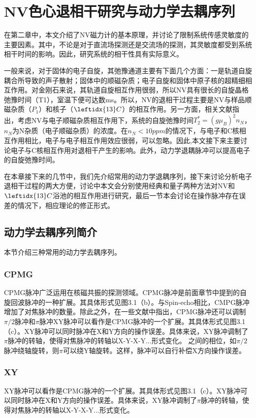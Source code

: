 
\chapter{NV色心退相干研究与动力学去耦序列}
在第二章中，本文介绍了NV磁力计的基本原理，并讨论了限制系统传感灵敏度的主要因素。其中，不论是对于直流场探测还是交流场的探测，其灵敏度都受到系统相干时间的影响。因此，研究系统的相干性具有实际意义。

一般来说，对于固体的电子自旋，其弛豫通道主要有下面几个方面：一是轨道自旋耦合所导致的声子散射；固体中的顺磁杂质；电子自旋和固体中原子核的超精细相互作用。对金刚石来说，其轨道自旋相互作用很弱，所以NV具有很长的自旋晶格弛豫时间（T1），室温下便可达数\si{ms}。所以，NV的退相干过程主要是NV与样品顺磁杂质（$P_1$）和核子（$\leftidx{13}C$）的相互作用。另一方面，相关文献指出，考虑NV与电子顺磁杂质相互作用下，系统的自旋弛豫时间$T_2^*=(g \mu_B)^2 n_N$，$n_N$为N杂质（电子顺磁杂质）的浓度。在$n_N < 10 \si{ppm}$的情况下，与电子和C核相互作用相比，电子与电子相互作用效应很弱，可以忽略。因此,本文接下来主要讨论电子与C核相互作用对退相干产生的影响。此外，动力学退耦脉冲可以提高电子的自旋弛豫时间。

在本章接下来的几节中，我们先介绍常用的动力学退耦序列，接下来讨论分析电子退相干过程的两大方便，讨论中本文会分别使用经典和量子两种方法对NV和$\leftidx{13}C$浴池的相互作用进行研究，最后一节本会讨论在操作脉冲存在误差的情况下，相应理论的修正形式。
\section{动力学去耦序列简介}
本节介绍三种常用的动力学去耦序列。
\subsection{CPMG}
CPMG脉冲广泛运用在核磁共振的探测领域。CPMG脉冲是前面章节中提到的自旋回波脉冲的一种扩展。其具体形式见图3.1（b）。与Spin-echo相比，CMPG脉冲增加了对焦脉冲的数量。除此之外，在一些文献中指出，CPMG脉冲还可以调制$\pi/2$脉冲和$\pi$脉冲XY脉冲可以看作是CPMG脉冲的一个扩展。其具体形式见图3.1（c）。XY脉冲可以同时脉冲在X和Y方向的操作误差。具体来说，XY脉冲调制了$\pi$脉冲的转轴，使得对焦脉冲的转轴以X-Y-X-Y...形式变化。
之间的相位，如$\pi/2$脉冲绕轴旋转，则$\pi$可以绕Y轴旋转。这样，脉冲可以自行补偿X方向操作误差。
\subsection{XY}
XY脉冲可以看作是CPMG脉冲的一个扩展。其具体形式见图3.1（c）。XY脉冲可以同时脉冲在X和Y方向的操作误差。具体来说，XY脉冲调制了$\pi$脉冲的转轴，使得对焦脉冲的转轴以X-Y-X-Y...形式变化。
